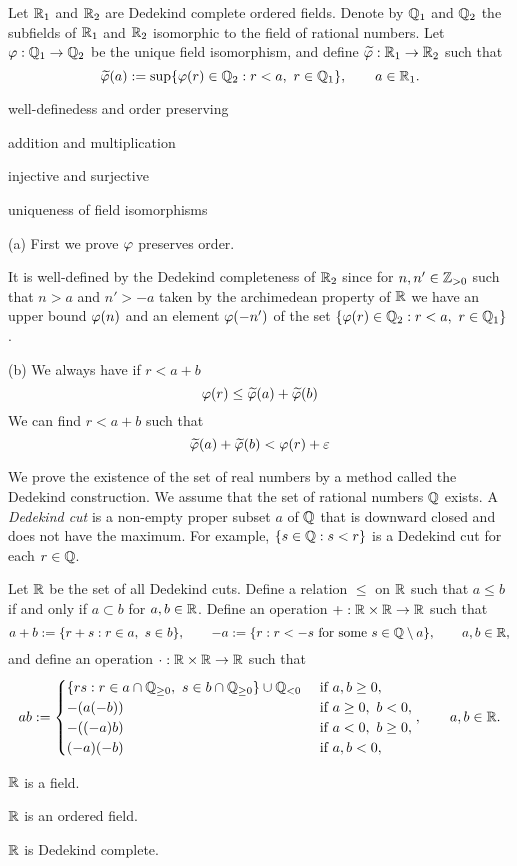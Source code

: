 \documentclass{../../large}
\begin{document}
\begin{prb}
Let $\mathbb{R}_1$ and $\mathbb{R}_2$ are Dedekind complete ordered fields.
Denote by $\mathbb{Q}_1$ and $\mathbb{Q}_2$ the subfields of $\mathbb{R}_1$ and $\mathbb{R}_2$ isomorphic to the field of rational numbers.
Let $\varphi:\mathbb{Q}_1\to\mathbb{Q}_2$ be the unique field isomorphism, and define $\widetilde{\varphi}:\mathbb{R}_1\to\mathbb{R}_2$ such that
\[\tilde\f(a):=\sup\{\f(r)\in\Q_2:r<a,\ r\in\Q_1\},\qquad a\in\R_1.\]
\begin{parts}
\item well-definedess and order preserving
\item addition and multiplication
\item injective and surjective
\item uniqueness of field isomorphisms
\end{parts}
\end{prb}
\begin{pf}
(a)
First we prove $\varphi$ preserves order.

It is well-defined by the Dedekind completeness of $\mathbb{R}_2$ since for $n,n'\in\mathbb{Z}_{>0}$ such that $n>a$ and $n'>-a$ taken by the archimedean property of $\mathbb{R}$ we have an upper bound $\varphi(n)$ and an element $\varphi(-n')$ of the set $\{\varphi(r)\in\mathbb{Q}_2:r<a,\ r\in\mathbb{Q}_1\}$.


(b)
We always have if $r<a+b$
\[\varphi(r)\le\widetilde{\varphi}(a)+\widetilde{\varphi}(b)\]
We can find $r<a+b$ such that
\[\widetilde{\varphi}(a)+\widetilde{\varphi}(b)<\varphi(r)+\varepsilon\]

\end{pf}


\begin{prb}
We prove the existence of the set of real numbers by a method called the Dedekind construction.
We assume that the set of rational numbers $\mathbb{Q}$ exists.
A \emph{Dedekind cut} is a non-empty proper subset $a$ of $\mathbb{Q}$ that is downward closed and does not have the maximum.
For example, $\{s\in\mathbb{Q}:s<r\}$ is a Dedekind cut for each $r\in\mathbb{Q}$.

Let $\mathbb{R}$ be the set of all Dedekind cuts.
Define a relation $\le$ on $\mathbb{R}$ such that $a\le b$ if and only if $a\subset b$ for $a,b\in\mathbb{R}$.
Define an operation $+:\mathbb{R}\times\mathbb{R}\to\mathbb{R}$ such that
\[a+b:=\{r+s:r\in a,\ s\in b\},\qquad -a:=\{r:r<-s\text{ for some }s\in\mathbb{Q}\setminus a\},\qquad a,b\in\mathbb{R},\]
and define an operation $\cdot:\mathbb{R}\times\mathbb{R}\to\mathbb{R}$ such that
\[ab:=\begin{cases}
\{rs:r\in a\cap\mathbb{Q}_{\ge0},\ s\in b\cap\mathbb{Q}_{\ge0}\}\cup\mathbb{Q}_{<0}&\text{ if }a,b\ge0,\\
-(a(-b))&\text{ if }a\ge0,\ b<0,\\
-((-a)b)&\text{ if }a<0,\ b\ge0,\\
(-a)(-b)&\text{ if }a,b<0,
\end{cases},\qquad a,b\in\mathbb{R}.\]

\begin{parts}
\item $\mathbb{R}$ is a field.
\item $\mathbb{R}$ is an ordered field.
\item $\mathbb{R}$ is Dedekind complete.
\end{parts}
\end{prb}
\end{document}
